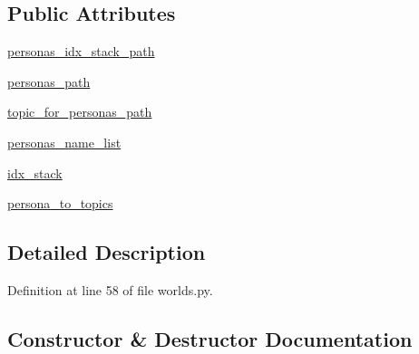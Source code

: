 \subsection*{Public Attributes}
\begin{DoxyCompactItemize}
\item 
\hyperlink{classparlai_1_1mturk_1_1tasks_1_1wizard__of__wikipedia_1_1worlds_1_1PersonasGenerator_a9c454a806475fb0b2eab6b6dac1b5296}{personas\+\_\+idx\+\_\+stack\+\_\+path}
\item 
\hyperlink{classparlai_1_1mturk_1_1tasks_1_1wizard__of__wikipedia_1_1worlds_1_1PersonasGenerator_a296d2c16e5eef15a27f6266316c2d775}{personas\+\_\+path}
\item 
\hyperlink{classparlai_1_1mturk_1_1tasks_1_1wizard__of__wikipedia_1_1worlds_1_1PersonasGenerator_a3e8ad4cab4e3e27bb7101981b7c62a65}{topic\+\_\+for\+\_\+personas\+\_\+path}
\item 
\hyperlink{classparlai_1_1mturk_1_1tasks_1_1wizard__of__wikipedia_1_1worlds_1_1PersonasGenerator_abf9a01dee416db70552558393aacc0cf}{personas\+\_\+name\+\_\+list}
\item 
\hyperlink{classparlai_1_1mturk_1_1tasks_1_1wizard__of__wikipedia_1_1worlds_1_1PersonasGenerator_a26ec8162aa90f3fa9a4e6e3d48bedc6e}{idx\+\_\+stack}
\item 
\hyperlink{classparlai_1_1mturk_1_1tasks_1_1wizard__of__wikipedia_1_1worlds_1_1PersonasGenerator_ad64661ce8580441c6facdf27a466605e}{persona\+\_\+to\+\_\+topics}
\end{DoxyCompactItemize}


\subsection{Detailed Description}


Definition at line 58 of file worlds.\+py.



\subsection{Constructor \& Destructor Documentation}
\mbox{\label{classparlai_1_1mturk_1_1tasks_1_1wizard__of__wikipedia_1_1worlds_1_1PersonasGenerator_a69ae53c0b17ddd4a5a2f4008382c4963}} 
